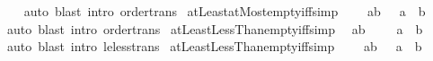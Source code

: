\begin{isabellebody}
%
\isadelimproof
\ \ %
\endisadelimproof
%
\isatagproof
{}\isamarkupfalse%
\ auto\ {\isacharparenleft}{\kern0pt}blast\ intro{\isacharcolon}{\kern0pt}\ order{\isacharunderscore}{\kern0pt}trans{\isacharparenright}{\kern0pt}%
\endisatagproof
{\isafoldproof}%
%
\isadelimproof
\isanewline
%
\endisadelimproof
\isanewline
{}\isamarkupfalse%
\ atLeastatMost{\isacharunderscore}{\kern0pt}empty{\isacharunderscore}{\kern0pt}iff{}{\isacharbrackleft}{\kern0pt}simp{\isacharbrackright}{\kern0pt}{\isacharcolon}{\kern0pt}\isanewline
\ \ {\isachardoublequoteopen}{\isacharbraceleft}{\kern0pt}{\isacharbraceright}{\kern0pt}\ {\isacharequal}{\kern0pt}\ {\isacharbraceleft}{\kern0pt}a{\isachardot}{\kern0pt}{\isachardot}{\kern0pt}b{\isacharbraceright}{\kern0pt}\ {\isasymlongleftrightarrow}\ {\isacharparenleft}{\kern0pt}{\isasymnot}\ a\ {\isasymle}\ b{\isacharparenright}{\kern0pt}{\isachardoublequoteclose}\isanewline
%
\isadelimproof
\ \ %
\endisadelimproof
%
\isatagproof
{}\isamarkupfalse%
\ auto\ {\isacharparenleft}{\kern0pt}blast\ intro{\isacharcolon}{\kern0pt}\ order{\isacharunderscore}{\kern0pt}trans{\isacharparenright}{\kern0pt}%
\endisatagproof
{\isafoldproof}%
%
\isadelimproof
\isanewline
%
\endisadelimproof
\isanewline
{}\isamarkupfalse%
\ atLeastLessThan{\isacharunderscore}{\kern0pt}empty{\isacharunderscore}{\kern0pt}iff{\isacharbrackleft}{\kern0pt}simp{\isacharbrackright}{\kern0pt}{\isacharcolon}{\kern0pt}\isanewline
\ \ {\isachardoublequoteopen}{\isacharbraceleft}{\kern0pt}a{\isachardot}{\kern0pt}{\isachardot}{\kern0pt}{\isacharless}{\kern0pt}b{\isacharbraceright}{\kern0pt}\ {\isacharequal}{\kern0pt}\ {\isacharbraceleft}{\kern0pt}{\isacharbraceright}{\kern0pt}\ {\isasymlongleftrightarrow}\ {\isacharparenleft}{\kern0pt}{\isasymnot}\ a\ {\isacharless}{\kern0pt}\ b{\isacharparenright}{\kern0pt}{\isachardoublequoteclose}\isanewline
%
\isadelimproof
\ \ %
\endisadelimproof
%
\isatagproof
{}\isamarkupfalse%
\ auto\ {\isacharparenleft}{\kern0pt}blast\ intro{\isacharcolon}{\kern0pt}\ le{\isacharunderscore}{\kern0pt}less{\isacharunderscore}{\kern0pt}trans{\isacharparenright}{\kern0pt}%
\endisatagproof
{\isafoldproof}%
%
\isadelimproof
\isanewline
%
\endisadelimproof
\isanewline
{}\isamarkupfalse%
\ atLeastLessThan{\isacharunderscore}{\kern0pt}empty{\isacharunderscore}{\kern0pt}iff{}{\isacharbrackleft}{\kern0pt}simp{\isacharbrackright}{\kern0pt}{\isacharcolon}{\kern0pt}\isanewline
\ \ {\isachardoublequoteopen}{\isacharbraceleft}{\kern0pt}{\isacharbraceright}{\kern0pt}\ {\isacharequal}{\kern0pt}\ {\isacharbraceleft}{\kern0pt}a{\isachardot}{\kern0pt}{\isachardot}{\kern0pt}{\isacharless}{\kern0pt}b{\isacharbraceright}{\kern0pt}\ {\isasymlongleftrightarrow}\ {\isacharparenleft}{\kern0pt}{\isasymnot}\ a\ {\isacharless}{\kern0pt}\ b{\isacharparenright}{\kern0pt}{\isachardoublequoteclose}\isanewline

\end{isabellebody}
